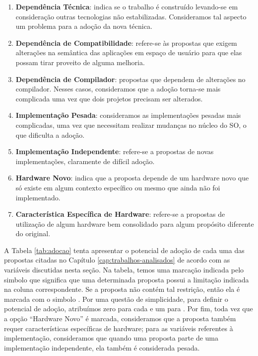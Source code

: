 \begin{enumerate}
  \item
\textbf{Dependência Técnica}: indica se o trabalho é construído
levando-se em consideração outras tecnologias não estabilizadas. Consideramos
tal aspecto um problema para a adoção da nova técnica.

  \item \textbf{Dependência de Compatibilidade}: refere-se às propostas que
exigem alterações na semântica das aplicações em espaço de usuário para que
elas possam tirar proveito de alguma melhoria.

  \item
\textbf{Dependência de Compilador}: propostas que dependem de alterações no
compilador. Nesses casos, consideramos que a adoção torna-se mais complicada
uma vez que dois projetos precisam ser alterados.

  \item
\textbf{Implementação Pesada}: consideramos as implementações pesadas mais
complicadas, uma vez que necessitam realizar mudanças no núcleo do SO, o que
dificulta a adoção.

  \item
\textbf{Implementação Independente}: refere-se a propostas de novas
implementações, claramente de difícil adoção.

  \item
\textbf{Hardware Novo}: indica que a proposta depende de um
hardware novo que só existe em algum contexto específico ou mesmo que ainda não
foi implementado.

  \item
\textbf{Característica Específica de Hardware}: refere-se a propostas de
utilização de algum hardware bem consolidado para algum propósito diferente do
original.

\end{enumerate}

A Tabela \ref{tab:adocao} tenta apresentar o potencial de adoção de cada uma
das propostas citadas no Capítulo \ref{cap:trabalhos-analisados} de acordo com
as variáveis discutidas nesta seção. Na tabela, temos uma marcação indicada
pelo simbolo  que significa que uma determinada proposta possui a
limitação indicada na coluna correspondente. Se a proposta não contém tal restrição, então ela
é marcada com o simbolo . Por uma questão de simplicidade, para
definir o potencial de adoção, atribuímos zero para cada  e um para
. Por fim, toda vez que a opção ``Hardware Novo'' é marcada,
consideramos que a proposta também requer características específicas de
hardware; para as variáveis referentes à implementação, consideramos que quando
uma proposta parte de uma implementação independente, ela também é considerada
pesada.


